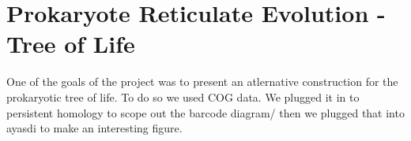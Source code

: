 \chapter{Prokaryote Reticulate Evolution - Tree of Life}
\label{ch:prokaryotes}

One of the goals of the project was to present an atlernative construction for the prokaryotic tree of life.
To do so we used COG data.
We plugged it in to persistent homology to scope out the barcode diagram/
then we plugged that into ayasdi to make an interesting figure.